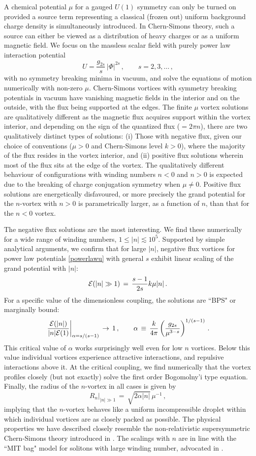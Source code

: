 \documentclass[12pt,a4paper]{article}
\def\be{\begin{equation}}
\def\ee{\end{equation}}
\begin{document}
A chemical potential $\mu$ for a gauged $U(1)$ symmetry  can only be turned on provided a source term representing a classical (frozen out) uniform background charge density is simultaneously introduced. In Chern-Simons theory, such a source can either be viewed as a distribution of heavy charges or as a uniform magnetic field. We focus on the massless scalar field with purely power law interaction potential
\be 
U=\frac{g_{2s}}{s}\,|\Phi|^{2s}\,,\qquad s=2,3,\ldots\,, \label{powerlawu}
\ee
 with no symmetry breaking minima in vacuum, and solve the equations of motion numerically  with non-zero $\mu$.  Chern-Simons vortices with symmetry breaking potentials in vacuum have vanishing magnetic fields in the interior and on the outside, with the flux being supported at the edges. The finite $\mu$ vortex solutions are qualitatively different as the magnetic flux acquires support within the vortex interior, and depending on the sign of the quantized flux ($=2\pi n$), there are two qualitatively distinct types of solutions: (i) Those with negative flux, given our choice of conventions ($\mu>0$ and Chern-Simons level $k>0$), where the majority of the flux resides in the vortex interior, and (ii) positive flux solutions wherein most of the flux sits at the edge of the vortex. The qualitatively different behaviour of configurations with winding numbers $n<0$ and $n>0$ is expected due to the breaking of charge conjugation symmetry when $\mu\neq 0$.  Positive flux solutions are energetically disfavoured, or more precisely the grand potential for the $n$-vortex with $n>0$ is parametrically larger, as a function of $n$, than that for the $n<0$ vortex. 
 
The negative flux solutions are the most interesting. We find these numerically for a wide range of winding numbers, $1\leq |n| \lesssim 10^5$. Supported by simple analytical arguments, we confirm that for large $|n|$, negative flux vortices for power law potentials \eqref{powerlawu} with general $s$  exhibit linear scaling of the grand potential with $|n|$:
\be
{\cal E}(|n|\gg 1)\,=\,\frac{s-1}{2s}{k\mu} |n|\,.
\ee
For a specific value of the dimensionless coupling, the solutions are ``BPS" or marginally bound:
\be
\left.\frac{{\cal E}(|n|)}{|n|{\cal E}(1)}\right|_{\alpha = s/(s-1)}\,\to\, 1\,,\qquad \alpha\,\equiv\,
\frac{k}{4\pi}\left(\frac{g_{2s}}{\mu^{3-s}}\right)^{1/(s-1)}\,.
\ee
This critical value of $\alpha$ works surprisingly well even for low $n$ vortices. Below this value  individual vortices experience attractive interactions,  and repulsive interactions above it.  At the critical coupling, we find numerically that the vortex profiles closely (but not exactly) solve the first order Bogomolny'i type equation.
Finally, the radius of the $n$-vortex in all cases is given by
\be
\left.R_n\right|_{|n|\gg 1} \,=\,\sqrt{2\alpha |n|}\,\mu^{-1}\,,
\ee
implying  that the $n$-vortex behaves like a uniform incompressible droplet within which individual vortices are as closely packed as possible. The physical properties we have described  closely resemble the non-relativistic supersymmetric Chern-Simons theory introduced in \cite{Tong:2015xaa}. The scalings with $n$ are in line with the ``MIT bag" model for solitons with large winding number, advocated in \cite{Bolognesi:2005ty, Bolognesi:2005rk, Bolognesi:2007ez}.
\end{document}
